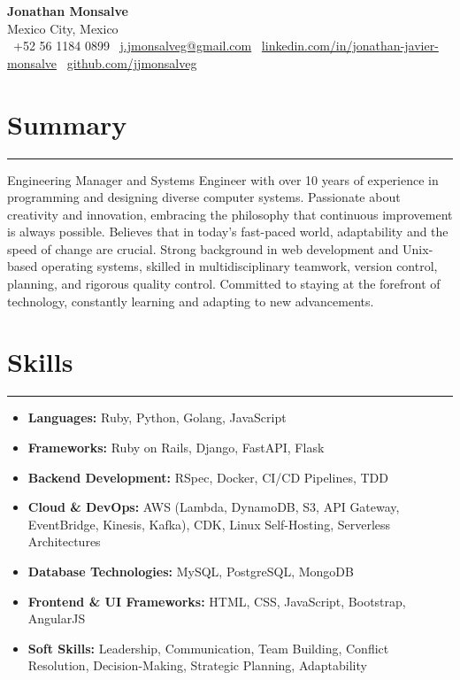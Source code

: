 \documentclass[a4paper,10pt]{article}
\begin{document}
\begin{center}
    \textbf{\LARGE Jonathan Monsalve} \\[0.5em]
    Mexico City, Mexico \\
    \faPhone \ +52 56 1184 0899 \hspace{1em}
    \faEnvelope \ \href{mailto:j.jmonsalveg@gmail.com}{j.jmonsalveg@gmail.com} \hspace{1em}
    \faLinkedin \ \href{http://linkedin.com/in/jonathan-javier-monsalve}{linkedin.com/in/jonathan-javier-monsalve} \hspace{1em}
    \faGithub \ \href{https://github.com/jjmonsalveg}{github.com/jjmonsalveg}
\end{center}

\vspace{0.5em}

\newcommand{\sectionline}{
    \noindent\rule{\linewidth}{0.4pt}\vspace{0.1em}
}

\section*{Summary}
\sectionline
Engineering Manager and Systems Engineer with over 10 years of experience in programming and designing diverse computer systems. Passionate about creativity and innovation, embracing the philosophy that continuous improvement is always possible. Believes that in today's fast-paced world, adaptability and the speed of change are crucial. Strong background in web development and Unix-based operating systems, skilled in multidisciplinary teamwork, version control, planning, and rigorous quality control. Committed to staying at the forefront of technology, constantly learning and adapting to new advancements.

\section*{Skills}
\sectionline
\vspace{-1em}
\begin{itemize}[leftmargin=0.5cm]
    \item \textbf{Languages:} Ruby, Python, Golang, JavaScript
    \item \textbf{Frameworks:} Ruby on Rails, Django, FastAPI, Flask
    \item \textbf{Backend Development:} RSpec, Docker, CI/CD Pipelines, TDD
    \item \textbf{Cloud \& DevOps:} AWS (Lambda, DynamoDB, S3, API Gateway, EventBridge, Kinesis, Kafka), CDK, Linux Self-Hosting, Serverless Architectures
    \item \textbf{Database Technologies:} MySQL, PostgreSQL, MongoDB
    \item \textbf{Frontend \& UI Frameworks:} HTML, CSS, JavaScript, Bootstrap, AngularJS
    \item \textbf{Soft Skills:} Leadership, Communication, Team Building, Conflict Resolution, Decision-Making, Strategic Planning, Adaptability
\end{itemize}
\end{document}
